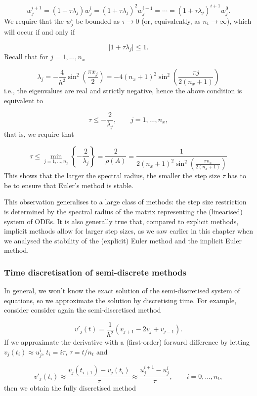 \documentclass[12pt,a4paper]{article}
\begin{document}
\[
w^{i+1}_j = \left(1 + \tau \lambda_j\right)w_j^i = \left(1 + \tau \lambda_j\right)^2w_j^{i-1} = \cdots = \left(1 + \tau \lambda_j\right)^{i+1}w_j^{0}.
\]
We require that the $w^{i}_j$ be bounded as $\tau \to 0$ (or, equivalently, as $n_t \to \infty$), which will occur if and only if

\[
\vert 1 + \tau \lambda_j \vert \leq 1.
\]
Recall that for $j = 1, \ldots, n_x$

\[
\lambda_j = -\frac{4}{h^2}\sin^2\left(\frac{\pi x_j}{2} \right) = -4(n_x+1)^2\sin^2\left(\frac{\pi j}{2(n_x +1)} \right) 
\]
i.e., the eigenvalues are real and strictly negative, hence the above condition is equivalent to

\[
\tau \leq -\frac{2}{\lambda_j}, \qquad j = 1, \ldots, n_x,
\]
that is, we require that

\[
\tau  \leq \min_{j = 1, \ldots, n_x}\left\lbrace  -\frac{2}{\lambda_j}  \right\rbrace = \frac{2}{\rho(A)} = \frac{1}{2(n_x+1)^2\sin^2\left(\frac{\pi n_x}{2(n_x +1)} \right)}
\]
This shows that the larger the spectral radius, the smaller the step size $\tau$ has to be to ensure that Euler's method is stable.  

This observation generalises to a large class of methods: the step size restriction is determined by the spectral radius of the matrix representing the (linearised) system of ODEs.  It is also generally true that, compared to explicit methods, implicit methods allow for larger step sizes, as we saw earlier in this chapter when we analysed the stability of the (explicit) Euler method and the implicit Euler method.  

\subsubsection{Time discretisation of semi-discrete methods}
In general, we won't know the exact solution of the semi-discretised system of equations, so we approximate the solution by discretising time.  For example, consider consider again the semi-discretised method 

\[
v'_j(t) = \frac{1}{h^2}\left(v_{j+1} - 2v_j + v_{j-1}   \right).
\]
If we approximate the derivative with a (first-order) forward difference by letting $v_j(t_i) \approx u^i_j$, $t_i = i\tau$, $\tau = t/n_t$ and 

\[
v'_j(t_i) \approx \frac{v_j(t_{i+1}) - v_j(t_i)}{\tau} \approx \frac{u^{i+1}_j - u^i_j}{\tau}, \qquad i = 0, \ldots, n_t,
\]
then we obtain the fully discretised method
\end{document}
